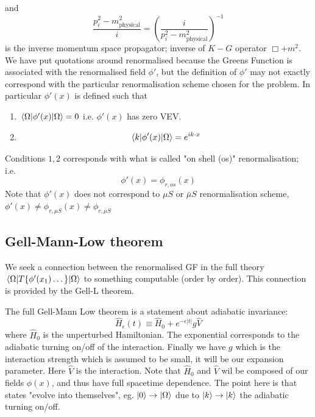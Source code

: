 and 
\begin{equation}
    \frac{p_{i}^2 - m_{\text{physical}}^2}{i} = \left( \frac{i}{p_{i}^{2} -m_{\text{physical}}^{2} }   \right)^{-1}
\end{equation}
is the inverse momentum space propagator; inverse of $K-G$ operator $\Box + m^2$. We have put quotations around renormalised because the Greens Function is associated with the renormalised field $\phi'$, but the definition of $\phi'$ may not exactly correspond with the particular renormalisation scheme chosen for the problem. In particular $\phi'(x)$ is defined such that
\begin{enumerate}
    \item $\mel{\Omega}{\phi'(x)}{\Omega} = 0$
i.e. $\phi'(x)$ has zero VEV.
\item $$\mel{k}{\phi'(x)}{\Omega} = e^{ik\cdot x}$$

\end{enumerate}
Conditions $1, 2$ corresponds with what is called "on shell (os)" renormalisation; i.e. 
\begin{equation}
    \phi'(x) = \phi_{r, os} (x)
\end{equation}
Note that $\phi'(x)$ does not correspond to $\mu S$ or $\bar{\mu} S$ renormalisation scheme, $\phi'(x) \neq \phi_{r, \mu S} (x)   \neq \phi_{r, \bar{\mu}S }$


\subsection{Gell-Mann-Low theorem}

We seek a connection between the renormalised GF in the full theory $\mel{\Omega}{T\{ \phi'(x_1) \dots  \}}{\Omega}$ to something computable (order by order). This connection is provided by the Gell-L theorem.

The full Gell-Mann Low theorem is a statement about adiabatic invariance: 
\begin{equation}
    \hat{H}_{\epsilon} (t) \equiv \hat{H}_{0} + e^{-\epsilon |t|} g \hat{V}
\end{equation}
where $\hat{H}_0$ is the unperturbed Hamiltonian. The exponential corresponds to the adiabatic turning on/off of the interaction. Finally we have $g$ which is the interaction strength which is assumed to be small, it will be our expansion parameter. Here $\hat{V}$ is the interaction. Note that $\hat{H}_0$ and $\hat{V}$ wil be composed of our fields $\phi(x)$, and thus have full spacetime dependence. The point here is that states "evolve into themselves", eg. $\ket{0} \to \ket{\Omega}$ due to $\ket{k} \to \ket{k}$ the adiabatic turning on/off. 


